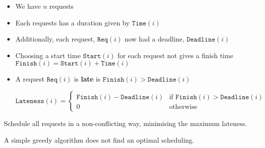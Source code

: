 \documentclass{article}
\newcommand{\F}{\texttt{F }}
\newcommand{\R}[1]{\texttt{Req}(#1)}
\renewcommand{\S}[1]{\texttt{Start}(#1)}
\renewcommand{\F}[1]{\texttt{Finish}(#1)}
\begin{document}
\begin{problem}

  \begin{itemize}
    \item We have $n$ requests
    \item Each requests has a duration given by $\texttt{Time}(i)$
    \item Additionally, each request, $\R{i}$ now had a deadline, $\texttt{Deadline}(i)$
    \item Choosing a start time $\S{i}$ for each request not gives a finish time $\F{i} = \S{i} + \texttt{Time}(i)$

    \item A request $\R{i}$ is \textbf{late} is $\F{i} > \texttt{Deadline}(i)$

          \[
          \texttt{Lateness}(i) =
          \begin{cases}
            \F{i} - \texttt{Deadline}(i) & \text{if } \F{i} > \texttt{Deadline}(i) \\
            0 & \text{otherwise}
          \end{cases}
          \]

  \end{itemize}

  Schedule all requests in a non-conflicting way, minimising the maximum lateness.
\end{problem}

A simple greedy algorithm does not find an optimal scheduling.
\end{document}
